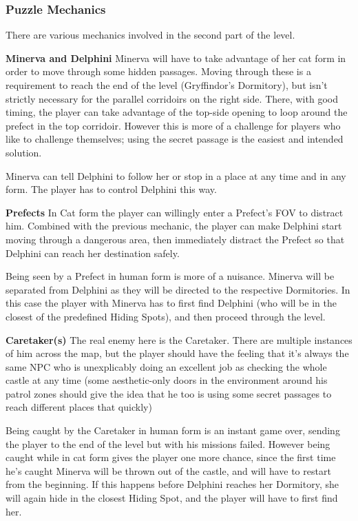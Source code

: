 \subsubsection{Puzzle Mechanics}

There are various mechanics involved in the second part of the level.

\textbf{Minerva and Delphini} Minerva will have to take advantage of her cat form in order to move through some hidden passages. Moving through these is a requirement to reach the end of the level (Gryffindor's Dormitory), but isn't strictly necessary for the parallel corridoirs on the right side. There, with good timing, the player can take advantage of the top-side opening to loop around the prefect in the top corridoir. However this is more of a challenge for players who like to challenge themselves; using the secret passage is the easiest and intended solution.

Minerva can tell Delphini to follow her or stop in a place at any time and in any form. The player has to control Delphini this way. 


\textbf{Prefects}
In Cat form the player can willingly enter a Prefect's FOV to distract him. Combined with the previous mechanic, the player can make Delphini start moving through a dangerous area, then immediately distract the Prefect so that Delphini can reach her destination safely.

Being seen by a Prefect in human form is more of a nuisance. Minerva will be separated from Delphini as they will be directed to the respective Dormitories. In this case the player with Minerva has to first find Delphini (who will be in the closest of the predefined Hiding Spots), and then proceed through the level.

\textbf{Caretaker(s)}
The real enemy here is the Caretaker. There are multiple instances of him across the map, but the player should have the feeling that it's always the same NPC who is unexplicably doing an excellent job as checking the whole castle at any time (some aesthetic-only doors in the environment around his patrol zones should give the idea that he too is using some secret passages to reach different places that quickly)

Being caught by the Caretaker in human form is an instant game over, sending the player to the end of the level but with his missions failed. However being caught while in cat form gives the player one more chance, since the first time he's caught Minerva will be thrown out of the castle, and will have to restart from the beginning. If this happens before Delphini reaches her Dormitory, she will again hide in the closest Hiding Spot, and the player will have to first find her.

